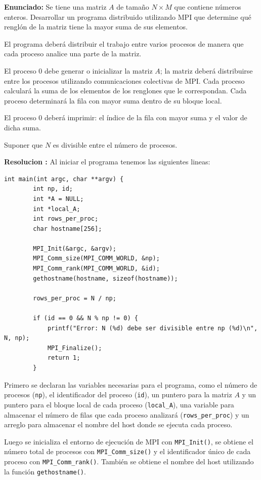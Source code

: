 \documentclass[letterpaper,11pt]{article}
\begin{document}
    \textbf{Enunciado: }
    Se tiene una matriz $A$ de tamaño $N \times M$ que contiene números enteros. Desarrollar un programa distribuido utilizando MPI que determine qué renglón de la matriz tiene la mayor suma de sus elementos.

    El programa deberá distribuir el trabajo entre varios procesos de manera que cada proceso analice una parte de la matriz.

    El proceso 0 debe generar o inicializar la matriz $A$; la matriz deberá distribuirse entre los procesos utilizando comunicaciones colectivas de MPI. Cada proceso calculará la suma de los elementos de los renglones que le correspondan. Cada proceso determinará la fila con mayor suma dentro de su bloque local.

    El proceso 0 deberá imprimir: el índice de la fila con mayor suma y el valor de dicha suma.

    Suponer que $N$ es divisible entre el número de procesos.

    \textbf{Resolucion :}
    Al iniciar el programa tenemos las siguientes lineas:

    \begin{lstlisting}[style=cstyle,caption={Generacion de matriz por el proceso 0 e impresion},label={lst:programa-b}]
        int main(int argc, char **argv) {
        int np, id;
        int *A = NULL;
        int *local_A;
        int rows_per_proc;
        char hostname[256];

        MPI_Init(&argc, &argv);
        MPI_Comm_size(MPI_COMM_WORLD, &np);
        MPI_Comm_rank(MPI_COMM_WORLD, &id);
        gethostname(hostname, sizeof(hostname));

        rows_per_proc = N / np;

        if (id == 0 && N % np != 0) {
            printf("Error: N (%d) debe ser divisible entre np (%d)\n", N, np);
            MPI_Finalize();
            return 1;
        }
    \end{lstlisting}
    
    Primero se declaran las variables necesarias para el programa, como el número de procesos (\texttt{np}), el identificador del proceso (\texttt{id}), un puntero para la matriz $A$ y un puntero para el bloque local de cada proceso (\texttt{local\_A}), una variable para almacenar el número de filas que cada proceso analizará (\texttt{rows\_per\_proc}) y un arreglo para almacenar el nombre del host donde se ejecuta cada proceso.
    
    Luego se inicializa el entorno de ejecución de MPI con \texttt{MPI\_Init()}, se obtiene el número total de procesos con \texttt{MPI\_Comm\_size()} y el identificador único de cada proceso con \texttt{MPI\_Comm\_rank()}. También se obtiene el nombre del host utilizando la función \texttt{gethostname()}.
    
\end{document}
